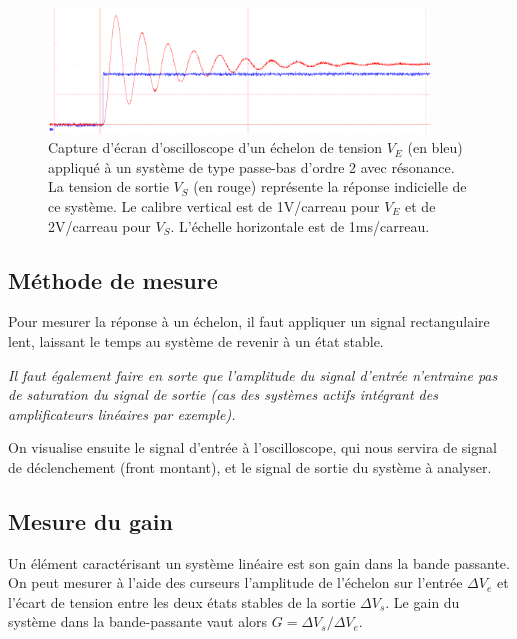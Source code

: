 \begin{figure}[h!]
    \centering
	\includegraphics[width=0.9\textwidth]{images/ri_ordre2.png}
	
    \caption{Capture d'écran d'oscilloscope d'un échelon de tension $V_E$ (en bleu) appliqué à un système de type passe-bas d'ordre 2 avec résonance. La tension de sortie $V_S$ (en rouge) représente la réponse indicielle de ce système. Le calibre vertical est de 1V/carreau pour $V_E$ et de 2V/carreau pour $V_S$. L'échelle horizontale est de 1ms/carreau.}
    \label{fig:ordre2}
\end{figure}


\subsection{Méthode de mesure}

Pour mesurer la réponse à un échelon, il faut appliquer un signal rectangulaire lent, laissant le temps au système de revenir à un état stable.

\textit{Il faut également faire en sorte que l'amplitude du signal d'entrée n'entraine pas de saturation du signal de sortie (cas des systèmes actifs intégrant des amplificateurs linéaires par exemple).}

\medskip

On visualise ensuite le signal d'entrée à l'oscilloscope, qui nous servira de signal de déclenchement (front montant), et le signal de sortie du système à analyser.



\newpage
\subsection{Mesure du gain}

Un élément caractérisant un système linéaire est son gain dans la bande passante. On peut mesurer à l'aide des curseurs l'amplitude de l'échelon sur l'entrée $\Delta{}V_e$ et l'écart de tension entre les deux états stables de la sortie $\Delta{}V_s$. Le gain du système dans la bande-passante vaut alors $G = \Delta{}V_s / \Delta{}V_e$.

